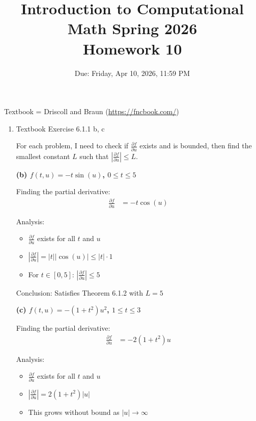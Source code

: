 \documentclass[reqno]{exam}
\title{Introduction to Computational Math Spring 2026 \\ Homework 10}
\date{Due: Friday, Apr 10, 2026, 11:59 PM}
\author{}
\begin{document}
\maketitle
\thispagestyle{empty}

Textbook = Driscoll and Braun (\url{https://fncbook.com/})

\begin{enumerate}

  \item Textbook Exercise 6.1.1 b, c

        \begin{solution}
          For each problem, I need to check if $\frac{\partial f}{\partial u}$ exists and is bounded, then find the smallest constant $L$ such that $\left|\frac{\partial f}{\partial u}\right| \leq L$.

          \medskip

          \textbf{(b) $f(t,u) = -t\sin(u)$, $0 \leq t \leq 5$}

          Finding the partial derivative:
          \begin{align*}
            \frac{\partial f}{\partial u} & = -t\cos(u)
          \end{align*}

          Analysis:
          \begin{itemize}
            \item $\frac{\partial f}{\partial u}$ exists for all $t$ and $u$
            \item $\left|\frac{\partial f}{\partial u}\right| = |t||\cos(u)| \leq |t| \cdot 1$
            \item For $t \in [0,5]$: $\left|\frac{\partial f}{\partial u}\right| \leq 5$
          \end{itemize}

          Conclusion: Satisfies Theorem 6.1.2 with $\boxed{L = 5}$

          \medskip

          \textbf{(c) $f(t,u) = -(1+t^2)u^2$, $1 \leq t \leq 3$}

          Finding the partial derivative:
          \begin{align*}
            \frac{\partial f}{\partial u} & = -2(1+t^2)u
          \end{align*}

          Analysis:
          \begin{itemize}
            \item $\frac{\partial f}{\partial u}$ exists for all $t$ and $u$
            \item $\left|\frac{\partial f}{\partial u}\right| = 2(1+t^2)|u|$
            \item This grows without bound as $|u| \to \infty$
          \end{itemize}


\end{solution}
\end{enumerate}
\end{document}

